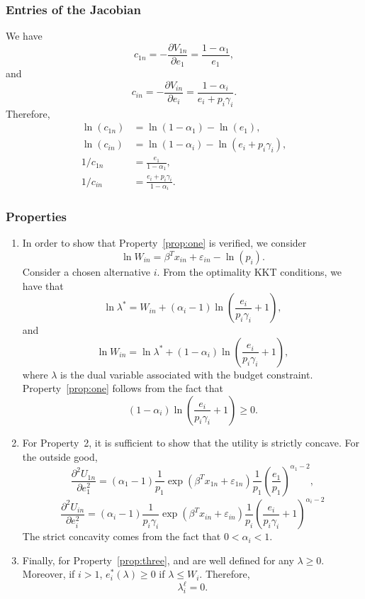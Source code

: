 \documentclass[12pt,a4paper]{article}
\begin{document}
\subsubsection*{Entries of the Jacobian}
We have
\[
c_{1n} = -\frac{\partial V_{1n}}{\partial e_1} = \frac{1-\alpha_1}{e_1},
\]
and
\[
c_{in} = -\frac{\partial V_{in}}{\partial e_i} =\frac{1-\alpha_i}{e_i + p_i \gamma_i}.
\]
Therefore,
\begin{align*}
    \ln(c_{1n}) &= \ln(1-\alpha_1) - \ln(e_1), \\
    \ln(c_{in}) &= \ln(1-\alpha_i) - \ln(e_i + p_i \gamma_i), \\
    1/c_{1n} &= \frac{e_1}{1-\alpha_1}, \\
    1/c_{in} &= \frac{e_i + p_i \gamma_i}{1-\alpha_i}.
\end{align*}

\subsubsection*{Properties}

\begin{enumerate}
\item In order to show that Property~\ref{prop:one} is verified, we consider
\[
    \ln W_{in}  =\beta^T x_{in} + \varepsilon_{in} -\ln(p_i).
\]
Consider a chosen alternative $i$. From the optimality KKT conditions, we have that
\[
   \ln \lambda^* =W_{in}+ (\alpha_i-1) \ln\left(\frac{e_i}{p_i \gamma_i}+1\right),
\]
and
\[
    \ln W_{in} =
    \ln \lambda^*  +(1-\alpha_i) \ln\left(\frac{e_i}{p_i \gamma_i}+1\right),
\]
where $\lambda$ is the dual variable associated with the budget constraint.
Property~\ref{prop:one} follows from the fact that
\[
     (1-\alpha_i) \ln\left(\frac{e_i}{p_i \gamma_i}+1\right) \geq 0.
\]
\item For Property~2, it is sufficient to show that the utility is strictly concave.
For the outside good,
\[
   \frac{\partial^2 U_{1n}}{\partial e_1^2} = (\alpha_1-1)\frac{1}{p_1} \exp(\beta^T x_{1n} + \varepsilon_{1n}) \frac{1}{p_1} \left(\frac{e_1}{p_1}\right)^{\alpha_1-2},
   \]
\[
   \frac{\partial^2 U_{in}}{\partial e_i^2} = (\alpha_i-1)\frac{1}{p_i\gamma_i}\exp(\beta^T x_{in} + \varepsilon_{in}) \frac{1}{p_i} \left(\frac{e_i}{p_i \gamma_i}+1\right)^{\alpha_i-2}
\]
The strict concavity comes from the fact that $0 <\alpha_i < 1$.
\item Finally, for Property~\ref{prop:three},  and  are well defined for any $\lambda \geq 0$. Moreover,
    if $i>1$, $e_i^*(\lambda) \geq 0$ if $\lambda \leq W_i$. Therefore,
\[
              \lambda^\ell_i = 0.
\]
\end{enumerate}
\end{document}
